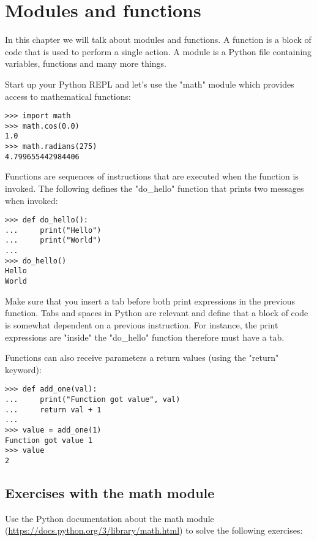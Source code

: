 \chapter{Modules and functions}\label{functions}

In this chapter we will talk about modules and functions. A function is a block of code that is used to perform a single action. A module is a Python file containing variables, functions and many more things. 

Start up your Python REPL and let's use the "math" module which provides access to mathematical functions:

\begin{lstlisting}
>>> import math
>>> math.cos(0.0)
1.0
>>> math.radians(275)
4.799655442984406
\end{lstlisting}

Functions are sequences of instructions that are executed when the function is invoked. The following defines the "do\_hello" function that prints two messages when invoked:

\begin{lstlisting}
>>> def do_hello():
...     print("Hello")
...     print("World")
... 
>>> do_hello()
Hello
World
\end{lstlisting}

Make sure that you insert a tab before both print expressions in the previous function. Tabs and spaces in Python are relevant and define that a block of code is somewhat dependent on a previous instruction. For instance, the print expressions are "inside" the "do\_hello" function therefore must have a tab.

Functions can also receive parameters a return values (using the "return" keyword):

\begin{lstlisting}
>>> def add_one(val):
...     print("Function got value", val)
...     return val + 1
... 
>>> value = add_one(1)
Function got value 1
>>> value
2
\end{lstlisting}

\section{Exercises with the math module}

Use the Python documentation about the math module (\url{https://docs.python.org/3/library/math.html}) to solve the following exercises:

